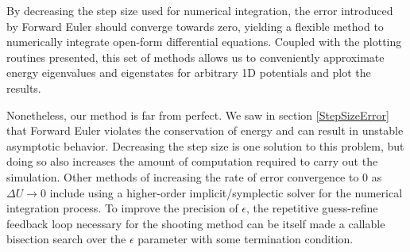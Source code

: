 \documentclass{article}
\begin{document}
By decreasing the step size used for numerical integration, the error
introduced by Forward Euler should converge towards zero, yielding a flexible
method to numerically integrate open-form differential equations. Coupled with
the plotting routines presented, this set of methods allows us to conveniently
approximate energy eigenvalues and eigenstates for arbitrary 1D potentials and
plot the results.

Nonetheless, our method is far from perfect. We saw in section
\ref{StepSizeError} that Forward Euler violates the conservation of energy and
can result in unstable asymptotic behavior. Decreasing the step size is one
solution to this problem, but doing so also increases the amount of computation
required to carry out the simulation. Other methods of increasing the rate of
error convergence to 0 as $\Delta U \rightarrow 0$ include using a higher-order
implicit/symplectic solver for the numerical integration process. To improve
the precision of $\epsilon$, the repetitive guess-refine feedback loop
necessary for the shooting method can be itself made a callable bisection search
over the $\epsilon$ parameter with some termination condition.
\end{document}
